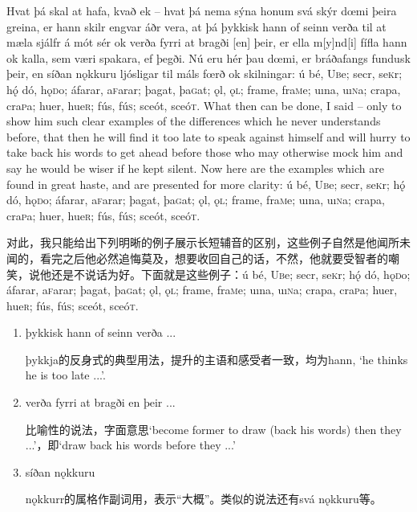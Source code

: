 \begin{paracol}{2}
  Hvat þá skal at hafa, kvað ek – hvat þá nema sýna honum svá skýr dœmi þeira greina, er hann skilr engvar áðr vera, at þá þykkisk hann of seinn verða til at mæla sjálfr á mót sér ok verða fyrri at bragði [en] þeir, er ella m[y]nd[i] fífla hann ok kalla, sem væri spakara, ef þegði. Nú eru hér þau dœmi, er bráðafangs fundusk þeir, en síðan nǫkkuru ljósligar til máls fœrð ok skilningar: ú bé, U\textsc{b}e; secr, se\textsc{k}r; hǫ́ dó, hǫ\textsc{d}o; áfarar, a\textsc{f}arar; þagat, þa\textsc{g}at; ǫl, ǫ\textsc{l}; frame, fra\textsc{m}e; uına, uı\textsc{n}a; crapa, cra\textsc{p}a; huer, hue\textsc{r}; fús, fú\textsc{s}; sceót, sceó\textsc{t}.
  \switchcolumn
  What then can be done, I said – only to show him such clear examples of the differences which he never understands before, that then he will find it too late to speak against himself and will hurry to take back his words to get ahead before those who may otherwise mock him and say he would be wiser if he kept silent. Now here are the examples which are found in great haste, and are presented for more clarity: ú bé, U\textsc{b}e; secr, se\textsc{k}r; hǫ́ dó, hǫ\textsc{d}o; áfarar, a\textsc{f}arar; þagat, þa\textsc{g}at; ǫl, ǫ\textsc{l}; frame, fra\textsc{m}e; uına, uı\textsc{n}a; crapa, cra\textsc{p}a; huer, hue\textsc{r}; fús, fú\textsc{s}; sceót, sceó\textsc{t}.
\end{paracol}
\begin{translation*}{}
  对此，我只能给出下列明晰的例子展示长短辅音的区别，这些例子自然是他闻所未闻的，看完之后他必然追悔莫及，想要收回自己的话，不然，他就要受智者的嘲笑，说他还是不说话为好。下面就是这些例子：ú bé, U\textsc{b}e; secr, se\textsc{k}r; hǫ́ dó, hǫ\textsc{d}o; áfarar, a\textsc{f}arar; þagat, þa\textsc{g}at; ǫl, ǫ\textsc{l}; frame, fra\textsc{m}e; uına, uı\textsc{n}a; crapa, cra\textsc{p}a; huer, hue\textsc{r}; fús, fú\textsc{s}; sceót, sceó\textsc{t}.
\end{translation*}
\begin{grammar*}{}
  \begin{enumerate}[leftmargin=*]
    \item þykkisk hann of seinn verða ...

          þykkja的反身式的典型用法，提升的主语和感受者一致，均为hann, `he thinks he is too late ...'.

    \item verða fyrri at bragði en þeir ...

          比喻性的说法，字面意思`become former to draw (back his words) then they ...'，即`draw back his words before they ...'

    \item síðan nǫkkuru

          nǫkkurr的属格作副词用，表示“大概”。类似的说法还有svá nǫkkuru等。
  \end{enumerate}
\end{grammar*}
